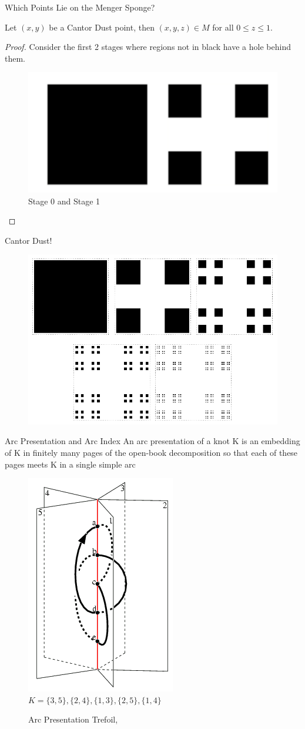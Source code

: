 \begin{frame}{Which Points Lie on the Menger Sponge?}
\begin{lemma}
    Let $ (x, y)$ be a Cantor Dust point, then $(x,y,z) \in M$ for all $0 \leq z \leq 1$.
\end{lemma}

\begin{proof}
Consider the first 2 stages where regions not in black have a hole behind them. 
    \begin{figure}
        \centering
        \includegraphics[width=0.22\linewidth]{ProofOfPointsOnSponge.png}
        \caption{Stage 0 and Stage 1 \cite{broden2024knotsinsidefractals}}
        \label{fig:enter-label}
    \end{figure}
\end{proof}
\end{frame}

\begin{frame}[c]{Cantor Dust!}
	 \begin{figure}
		\centering
		\includegraphics[width=0.5\linewidth]{cantordust.png}
		\caption{\cite{Dickau_Cantor_Dust}}
		\label{fig:enter-label}
	\end{figure}
\end{frame}

\begin{frame}{Arc Presentation and Arc Index}
An arc presentation of a knot K is an embedding of K in finitely many pages of the open-book decomposition so that each of these pages meets K in a single simple arc
\begin{figure}
    \centering
    \includegraphics[width=0.2\linewidth]{MichaelImages/arc_index_fig1.png} $K = \{3,5\}, \{2,4\}, \{1,3\}, \{2,5\}, \{1,4\} $
    \caption{Arc Presentation Trefoil, \cite{inproceedings}}
    \label{fig:enter-label}
\end{figure}
\end{frame}

